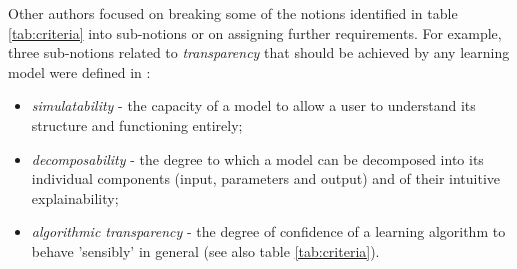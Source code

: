 \documentclass[final,1p,times]{elsarticle}
\begin{document}
Other authors focused on breaking some of the notions identified in table \ref{tab:criteria} into sub-notions or on assigning further requirements. 
For example, three sub-notions related to \emph{transparency} that should be achieved by any learning model were defined in \cite{dam2018explainable,lipton2018mythos}: 
\begin{itemize}
    \item \textit{simulatability} - the capacity of a model to allow a user to understand its structure and functioning entirely;
    \item \textit{decomposability} - the degree to which a model can be decomposed into its individual components (input, parameters and output) and of their intuitive explainability;
    \item \textit{algorithmic transparency} - the degree of confidence of a learning algorithm to behave 'sensibly' in general (see also table \ref{tab:criteria}). 
\end{itemize}
\end{document}
